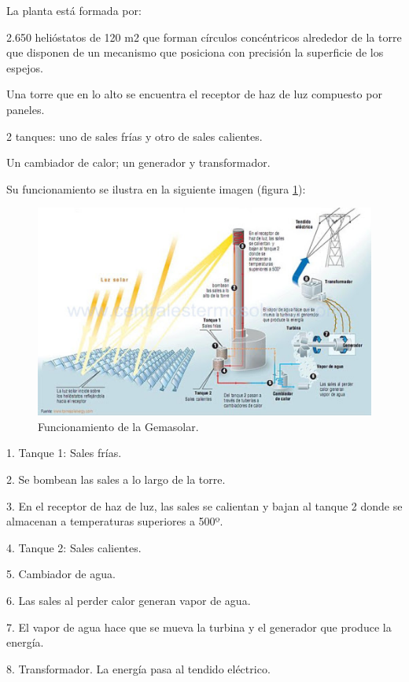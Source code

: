 La planta está formada por:

2.650 helióstatos de 120 m2 que forman círculos concéntricos alrededor de la torre que disponen de un mecanismo que posiciona con precisión la superficie de los espejos.

Una torre que en lo alto se encuentra el receptor de haz de luz compuesto por paneles.

2 tanques: uno de sales frías y otro de sales calientes.

Un cambiador de calor; un generador y transformador.

Su funcionamiento se ilustra en la siguiente imagen (figura \ref{fig:FotosPaginasWebHeliostatos/unnamed(8).jpg}):

\begin{figure}[h!]
  	\centering
	\includegraphics[width=\textwidth]{FotosPaginasWebHeliostatos/unnamed(8).jpg}
	\caption{Funcionamiento de la Gemasolar.
	\label{fig:FotosPaginasWebHeliostatos/unnamed(8).jpg}}
\end{figure}

1. Tanque 1: Sales frías.

2. Se bombean las sales a lo largo de la torre.

3. En el receptor de haz de luz, las sales se calientan y bajan al tanque 2 donde se almacenan a temperaturas superiores a 500º.

4. Tanque 2: Sales calientes.

5. Cambiador de agua.

6. Las sales al perder calor generan vapor de agua.

7. El vapor de agua hace que se mueva la turbina y el generador que produce la energía.

8. Transformador. La energía pasa al tendido eléctrico.

